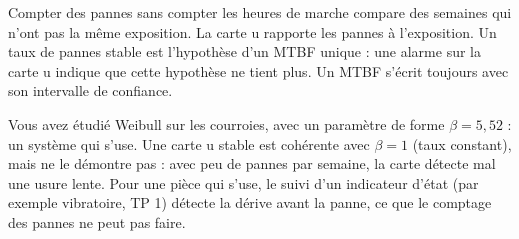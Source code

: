 \documentclass[10pt,a4paper]{article}
\begin{document}
\begin{tcolorbox}[retenir]
Compter des pannes sans compter les heures de marche compare des semaines qui n'ont pas la même exposition. La carte u rapporte les pannes à l'exposition. Un taux de pannes stable est l'hypothèse d'un MTBF unique : une alarme sur la carte u indique que cette hypothèse ne tient plus. Un MTBF s'écrit toujours avec son intervalle de confiance.
\end{tcolorbox}
\begin{tcolorbox}[plus]
Vous avez étudié Weibull sur les courroies, avec un paramètre de forme $\beta = 5{,}52$ : un système qui s'use. Une carte u stable est cohérente avec $\beta = 1$ (taux constant), mais ne le démontre pas : avec peu de pannes par semaine, la carte détecte mal une usure lente. Pour une pièce qui s'use, le suivi d'un indicateur d'état (par exemple vibratoire, TP 1) détecte la dérive avant la panne, ce que le comptage des pannes ne peut pas faire.
\end{tcolorbox}
\end{document}
